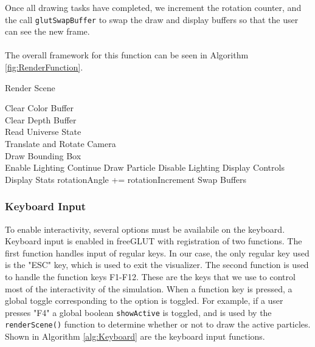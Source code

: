\documentclass[fleqn,10pt]{UserGuideArx} %
\begin{document}
    Once all drawing tasks have completed, we increment the rotation counter, and the call \texttt{glutSwapBuffer} to swap the draw and display buffers so that the user can see the new frame.\\~\\
    The overall framework for this function can be seen in Algorithm \ref{fig:RenderFunction}.

    \begin{algorithm}
        \caption{Render Scene}\label{fig:RenderFunction}
        Clear Color Buffer\\
        Clear Depth Buffer\\
        Read Universe State\\
        Translate and Rotate Camera\\
        Draw Bounding Box\\
        {
            Enable Lighting
        }
        {
            {
                Continue
            }
            \Else
            {
                Draw Particle
            }
        }
        {
            Disable Lighting
        }
        Display Controls
        Display Stats
        {
            rotationAngle += rotationIncrement 
        }
        Swap Buffers
    \end{algorithm}
    
\subsubsection{Keyboard Input}
    To enable interactivity, several options must be availabile on the keyboard. Keyboard input is enabled in freeGLUT with registration of two functions. The first function handles input of regular keys. In our case, the only regular key used is the "ESC" key, which is used to exit the visualizer. The second function is used to handle the function keys F1-F12. These are the keys that we use to control most of the interactivity of the simulation. When a function key is pressed, a global toggle corresponding to the option is toggled. For example, if a user presses "F4" a global boolean \texttt{showActive} is toggled, and is used by the \texttt{renderScene()} function to determine whether or not to draw the active particles. Shown in Algorithm \ref{alg:Keyboard} are the keyboard input functions.\\
\end{document}
